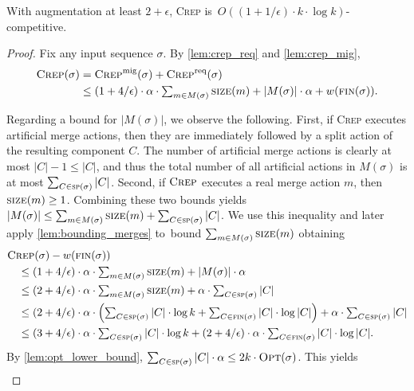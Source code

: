 \documentclass{siamart190516}
\newcommand{\OPT}{\textsc{Opt}\xspace}
\newcommand{\CREP}{\textsc{Crep}\xspace}
\newcommand{\CREPreq}{\CREP^\textnormal{req}}
\newcommand{\CREPmig}{\CREP^\textnormal{mig}}
\newcommand{\eps}{\ensuremath{\epsilon}}
\newcommand{\spl}{\textsc{sp}}
\newcommand{\final}{\textsc{fin}}
\newcommand{\size}{\textsc{size}}
\begin{document}
\begin{theorem}
With augmentation at least $2+\eps$, \CREP is~$O((1 + 1/\eps) \cdot k \cdot \log k)$-competitive.
\end{theorem}

\begin{proof}
Fix any input sequence $\sigma$. 
By \cref{lem:crep_req} and \cref{lem:crep_mig}, 
\begin{align*}
	\CREP(\sigma) 
	= &\; \CREPmig(\sigma) + \CREPreq(\sigma) \\
	\leq &\; \textstyle (1+4/\eps) \cdot \alpha \cdot \sum_{m \in M(\sigma)} \size(m) + |M(\sigma)| \cdot \alpha + w(\final(\sigma)).
\end{align*}

Regarding a bound for $|M(\sigma)|$, we observe the following. First, if \CREP
executes artificial merge actions, then they are immediately followed by a
split action of the resulting component $C$. The number of artificial merge
actions is clearly at most $|C|-1 \leq |C|$, and thus the total number of all
artificial actions in $M(\sigma)$ is at most $\sum_{C \in \spl(\sigma)} |C|$.
Second, if $\CREP$ executes a real merge action $m$, then
$\size(m) \geq 1$. Combining these two bounds yields $|M(\sigma)| \leq \sum_{m
\in M(\sigma)} \size(m) + \sum_{C \in \spl(\sigma)} |C|$. We use this inequality 
and later apply \cref{lem:bounding_merges} to~bound $\sum_{m \in M(\sigma)} 
\size(m)$ obtaining
\begin{align*}
	& \CREP(\sigma) - w(\final(\sigma)) \\
  &\quad \leq  \textstyle (1+4/\eps) \cdot \alpha \cdot \sum_{m \in M(\sigma)} \size(m) 
    + |M(\sigma)| \cdot \alpha \\ 
	&\quad \leq \textstyle (2+4/\eps) \cdot \alpha \cdot \sum_{m \in M(\sigma)} \size(m) 
		+ \alpha \cdot \sum_{C \in \spl(\sigma)} |C|  \\
	&\quad \leq \textstyle (2+4/\eps) \cdot \alpha \cdot \left( 
			\sum_{C \in \spl(\sigma)} |C| \cdot \log k + \sum_{C \in \final(\sigma)} |C| \cdot \log |C|
			\right)
			+ \alpha \cdot \sum_{C \in \spl(\sigma)} |C| \\
	&\quad \leq \textstyle (3+4/\eps) \cdot \alpha \cdot 
			\sum_{C \in \spl(\sigma)} |C| \cdot \log k 
			+ (2+4/\eps) \cdot \alpha \cdot
			\sum_{C \in \final(\sigma)} |C| \cdot \log |C|.
\end{align*}
By \cref{lem:opt_lower_bound}, $\sum_{C \in \spl(\sigma)} |C| \cdot \alpha \leq 
2k \cdot \OPT(\sigma)$. This yields
\begin{align*}

\end{align*}
\end{proof}
\end{document}
